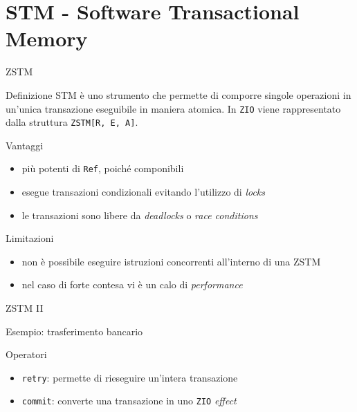 \section{STM - Software Transactional Memory}
\begin{frame}{ZSTM}
  \begin{block}{Definizione}
    STM è uno strumento che permette di comporre singole operazioni in un'unica transazione eseguibile in maniera atomica. In \texttt{ZIO} viene rappresentato dalla struttura \texttt{ZSTM[R, E, A]}.
  \end{block}

  \begin{exampleblock}{Vantaggi}
    \begin{itemize}
      \item più potenti di \texttt{Ref}, poiché componibili
      \item esegue transazioni condizionali evitando l'utilizzo di \textit{locks}
      \item le transazioni sono libere da \textit{deadlocks} o \textit{race conditions}
    \end{itemize}
  \end{exampleblock}

  \begin{alertblock}{Limitazioni}
    \begin{itemize}
      \item non è possibile eseguire istruzioni concorrenti all'interno di una ZSTM
      \item nel caso di forte contesa vi è un calo di \textit{performance}
    \end{itemize}
  \end{alertblock}
\end{frame}

\begin{frame}{ZSTM II}
  \begin{block}{Esempio: trasferimento bancario}
    
  \end{block}
  \begin{block}{Operatori}
    \begin{itemize}
      \item \texttt{retry}: permette di rieseguire un'intera transazione
      \item \texttt{commit}: converte una transazione in uno \texttt{ZIO} \textit{effect}
    \end{itemize}
  \end{block}
\end{frame}